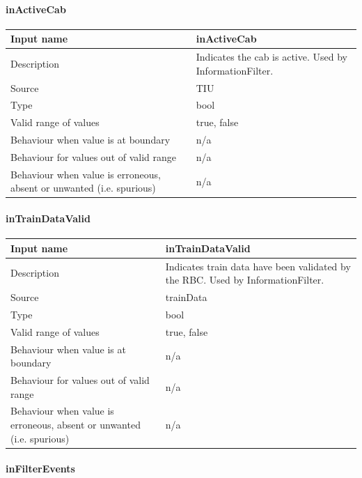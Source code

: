 \paragraph{inActiveCab}

\begin{longtable}{p{}p{}}
\toprule
Input name				& inActiveCab \\
\midrule
Description				& Indicates the cab is active. Used by InformationFilter. \\
\midrule
Source					& TIU\\ 
\midrule
Type					& bool\\
\midrule
Valid range of values	& true, false\\
\midrule
Behaviour when value is at boundary	& n/a\\
\midrule
Behaviour for values out of valid range	& n/a\\
\midrule
Behaviour when value is erroneous, absent or unwanted (i.e. spurious) & n/a\\
\bottomrule
\end{longtable}

\paragraph{inTrainDataValid}

\begin{longtable}{p{}p{}}
\toprule
Input name				& inTrainDataValid \\
\midrule
Description				& Indicates train data have been validated by the RBC. Used by InformationFilter. \\
\midrule
Source					& trainData\\ 
\midrule
Type					& bool\\
\midrule
Valid range of values	& true, false\\
\midrule
Behaviour when value is at boundary	& n/a\\
\midrule
Behaviour for values out of valid range	& n/a\\
\midrule
Behaviour when value is erroneous, absent or unwanted (i.e. spurious) & n/a\\
\bottomrule
\end{longtable}

\paragraph{inFilterEvents}

